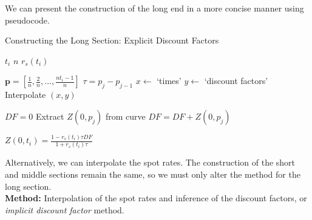 We can present the construction of the long end in a more concise manner using pseudocode.

\begin{algorithm}
\caption{Constructing the Long Section: Explicit Discount Factors}\label{alg:boot_dfs}
    \begin{algorithmic}[1]
    \Require $t_i$
    \Require $n$ 
    \Require $r_s(t_i)$

    \State $\textbf{p} = [\frac{1}{n}, \frac{2}{n}, \ldots, \frac{n t_i - 1}{n}]$ 
    \State $\tau = p_j - p_{j-1} $ 
    \State $x \gets$ `times'
    \State $y \gets$ `discount factors'
    \State Interpolate $(x,y)$

    \State $DF = 0$
        \State Extract $Z(0,p_j)$ from curve
        \State $DF = DF + Z(0,p_j)$ 
    \EndFor

    \State $Z(0,t_i) = \frac{1 - r_s(t_i) \tau DF}{1 + r_s(t_i) \tau}$
    \Repeat
    \end{algorithmic}
\end{algorithm}

\FloatBarrier

Alternatively, we can interpolate the spot rates. The construction of the short and middle sections remain the same, so we must only alter the method for the long section. \\[8pt]
\textbf{Method:} Interpolation of the spot rates and inference of the discount factors, or \textit{implicit discount factor} method.

